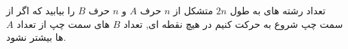 \begin{PROBLEM}
    تعداد رشته های به طول 
    $2n$
    متشکل از
    $n$
    حرف 
  $A$
    و
    $n$
    حرف
  $B$
    را بیابید که اگر از سمت چپ شروع به حرکت کنیم در هیچ نقطه ای, تعداد 
  $B$
    های سمت چپ از تعداد 
  $A$
   ها بیشتر نشود.
  \end{PROBLEM}